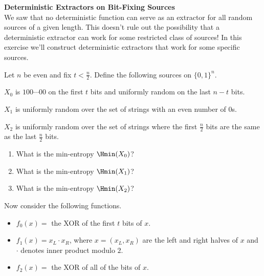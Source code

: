\begin{exercises}
\item {\bf Deterministic Extractors on Bit-Fixing Sources}\\
We saw that no deterministic function can serve as an extractor for all random sources of a given length. 
This doesn't rule out the possibility that a deterministic extractor can work for some restricted class of sources! In this exercise we'll construct deterministic extractors that work for some specific sources. 

Let $n$ be even and fix $t < \frac n2$. Define the following sources on $\{0,1\}^n$.
\begin{statements}
	\item $X_0$ is $100\cdots00$ on the first $t$ bits and uniformly random on the last $n-t$ bits.
	\item $X_1$ is uniformly random over the set of strings with an even number of $0$s.
	\item $X_2$ is uniformly random over the set of strings where the first $\frac n2$ bits are the same as the last $\frac n2$ bits.
\end{statements}
\begin{enumerate}
\item What is the min-entropy $\Hmin(X_0)$?
\item What is the min-entropy $\Hmin(X_1)$?
\item What is the min-entropy $\Hmin(X_2)$?
\end{enumerate}
Now consider the following functions. 
\begin{itemize}
	\item $f_0(x)=$ the XOR of the first $t$ bits of $x$.
	\item $f_1(x)= x_L\cdot x_R$, where $x=(x_L,x_R)$ are the left and right halves of $x$ and $\cdot$ denotes inner product modulo $2$.
	\item $f_2(x)=$ the XOR of all of the bits of $x$.
\end{itemize}

\end{exercises}
